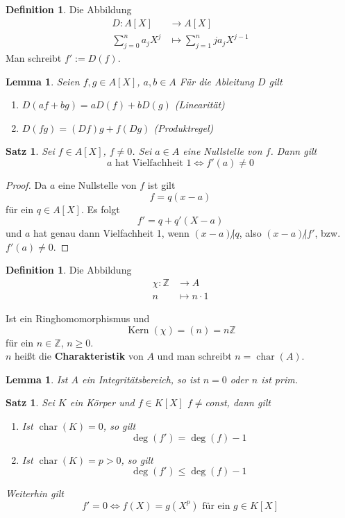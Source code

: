 \documentclass[10pt,a4paper]{article}
\newcommand{\Z}{\ensuremath{\mathbb{Z}}}
\newcommand{\cha}{\operatorname{char}}
\newcommand{\Kern}{\operatorname{Kern}}
\theoremstyle{plain}
\newtheorem{lem}[theorem]{Lemma}
\newtheorem{satz}[theorem]{Satz}
\theoremstyle{definition}
\newtheorem{definition}[theorem]{Definition}
\theoremstyle{remark}
\begin{document}
	\begin{definition}
		Die Abbildung
		\begin{align*}
		D: A[X]&\to A[X]\\
		\sum_{j=0}^{n}a_jX^j&\mapsto\sum_{j=1}^n ja_jX^{j-1}
		\end{align*}
		Man schreibt $f':=D(f)$.
	\end{definition}
	\begin{lem}
		Seien $f,g\in A[X]$, $a,b\in A$
		Für die Ableitung $D$ gilt
		\begin{enumerate}
			\item $D(af+bg)=aD(f)+bD(g)$ (Linearität)
			\item $D(fg)=(Df)g+f(Dg)$ (Produktregel)
		\end{enumerate}
	\end{lem}

	\begin{satz}
		Sei $f\in A[X]$, $f\neq 0$. Sei $a\in A$ eine Nullstelle von $f$. Dann gilt
		\[\text{$a$ hat Vielfachheit $1$}\Leftrightarrow f'(a)\neq 0\]
	\end{satz}
	\begin{proof}
		Da $a$ eine Nullstelle von $f$ ist gilt
		\[f=q(x-a)\]
		für ein $q\in A[X]$. Es folgt
		\[f'=q+q'(X-a)\]
		und $a$ hat genau dann Vielfachheit 1, wenn $(x-a)\not| q$, also $(x-a)\not | f'$, bzw. $f'(a)\neq 0$.
	\end{proof}

	\begin{definition}
		Die Abbildung
		\begin{align*}
		\chi:\Z&\to A\\
		n&\mapsto n\cdot 1
		\end{align*}
		
			Ist ein Ringhomomorphismus und
		\[\Kern(\chi)=(n)=n\Z\]
		für ein $n\in\Z$, $n\geq 0$.\\
		$n$ heißt die \textbf{Charakteristik} von $A$ und man schreibt $n=\cha(A)$.
	\end{definition}

	\begin{lem}
		Ist $A$ ein Integritätsbereich, so ist $n=0$ oder $n$ ist prim.
	\end{lem}
	
	\begin{satz}
		Sei $K$ ein Körper und $f\in K[X]$ $f\neq $const, dann gilt
		\begin{enumerate}
			\item Ist $\cha(K)=0$, so gilt 
			\[\deg(f')=\deg(f)-1\]
			\item Ist $\cha(K)=p>0$, so gilt
			\[\deg(f')\leq \deg(f)-1\]
		\end{enumerate}
		Weiterhin gilt
		\[f'=0\Leftrightarrow f(X)=g(X^p)\text{ für ein $g\in K[X]$}\]
	\end{satz}
\end{document}
